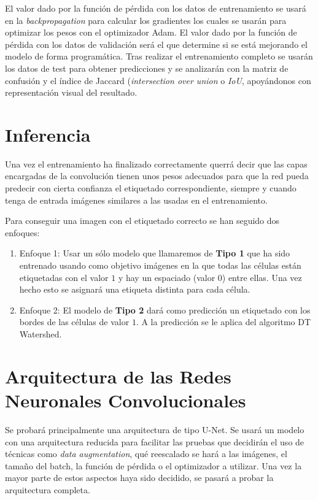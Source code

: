 El valor dado por la función de pérdida con los datos de entrenamiento se usará en la \textit{backpropagation} para calcular los gradientes los cuales se usarán para optimizar los pesos con el optimizador Adam. El valor dado por la función de pérdida con los datos de validación será el que determine si se está mejorando el modelo de forma programática. Tras realizar el entrenamiento completo  se usarán los datos de test para obtener predicciones y se analizarán con la matriz de confusión y el índice de Jaccard (\textit{intersection over union} o \textit{IoU}, apoyándonos con representación visual del resultado.

\pagebreak \section{Inferencia}\label{sec:inferencia}


Una vez el entrenamiento ha finalizado correctamente querrá decir que las capas encargadas de la convolución tienen unos pesos adecuados para que la red pueda predecir con cierta confianza el etiquetado correspondiente, siempre y cuando tenga de entrada imágenes similares a las usadas en el entrenamiento.

Para conseguir una imagen con el etiquetado correcto se han seguido dos enfoques:
\begin{enumerate}
\item Enfoque 1: Usar un sólo modelo que llamaremos de \textbf{Tipo 1} que ha sido entrenado usando como objetivo imágenes en la que todas las células están etiquetadas con el valor $ 1 $ y hay un espaciado (valor $ 0 $) entre ellas. Una vez hecho esto se asignará una etiqueta distinta para cada célula.
\item Enfoque 2: El modelo de \textbf{Tipo 2} dará como predicción un etiquetado con los bordes de las células de valor $ 1 $. A la predicción se le aplica del algoritmo DT Watershed.
\end{enumerate}

\pagebreak \section{Arquitectura de las Redes Neuronales Convolucionales}\label{sec:cnn_arch}

Se probará principalmente una arquitectura de tipo U-Net. Se usará un modelo con una arquitectura reducida para facilitar las pruebas que decidirán el uso de técnicas como \textit{data augmentation}, qué reescalado se hará a las imágenes, el tamaño del batch, la función de pérdida o el optimizador a utilizar. Una vez la mayor parte de estos aspectos haya sido decidido, se pasará a probar la arquitectura completa.

